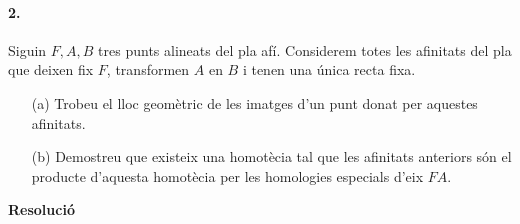 \documentclass[11pt]{article}
\begin{document}
\paragraph{2.}	Siguin $F,A,B$ tres punts alineats del pla afí. Considerem totes les afinitats del pla que deixen fix $F$, transformen $A$ en $B$ i tenen una única recta fixa.
\begin{enumerate}
	\item[(a)] Trobeu el lloc geomètric de les imatges d'un punt donat per aquestes afinitats.
	\item[(b)] Demostreu que existeix una homotècia tal que les afinitats anteriors són el producte d'aquesta homotècia per les homologies especials d'eix $FA$.
\end{enumerate}
\textbf{Resolució}\\
\end{document}
